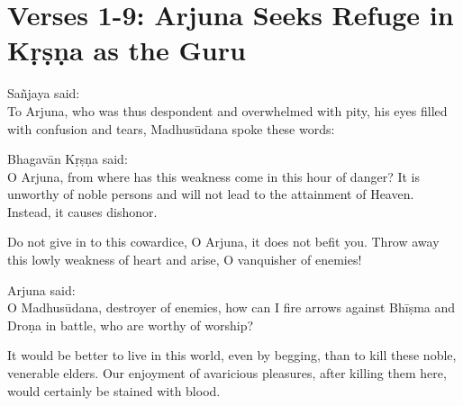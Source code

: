 \section{Verses 1-9: Arjuna Seeks Refuge in Kṛṣṇa as the Guru}\label{sec-verses-1-9-arjuna-seeks-refuge-in-krsna-as-the-guru}

{\hspace*{1em}Sañjaya said: \\
To Arjuna, who was thus despondent and overwhelmed with pity, his eyes filled with confusion and tears, Madhusūdana spoke these words:}

{\hspace*{1em}Bhagavān Kṛṣṇa said: \\
O Arjuna, from where has this weakness come in this hour of danger? It is unworthy of noble persons and will not lead to the attainment of Heaven. Instead, it causes dishonor.}

{Do not give in to this cowardice, O Arjuna, it does not befit you. Throw away this lowly weakness of heart and arise, O vanquisher of enemies!}

{\hspace*{1em}Arjuna said: \\
O Madhusūdana, destroyer of enemies, how can I fire arrows against Bhīṣma and Droṇa in battle, who are worthy of worship?}

{It would be better to live in this world, even by begging, than to kill these noble, venerable elders. Our enjoyment of avaricious pleasures, after killing them here, would certainly be stained with blood.}

